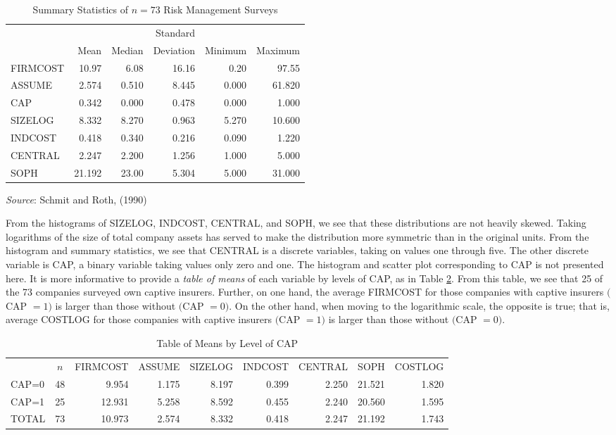 \begin{table}[h]
\caption{\label{T6:RiskSumStats} Summary Statistics of $n=73$ Risk
Management Surveys}
\begin{tabular}{lrrrrr}
\hline
&  &    & Standard &  &  \\
&  Mean & Median & Deviation & Minimum & Maximum \\ \hline FIRMCOST
&  10.97 & 6.08 & 16.16 &
0.20 & 97.55 \\
ASSUME &   2.574 & 0.510 & 8.445 &
0.000 & 61.820 \\
CAP & 0.342 & 0.000 & 0.478 &
0.000 & 1.000 \\
SIZELOG &   8.332 & 8.270 & 0.963 &
5.270 & 10.600 \\
INDCOST &   0.418 & 0.340 & 0.216 &
0.090 & 1.220 \\
CENTRAL &   2.247 & 2.200 & 1.256 &
1.000 & 5.000 \\
SOPH &  21.192 &23.00 & 5.304 & 5.000 & 31.000 \\ \hline
\end{tabular}

{\small \textit{Source}: Schmit and Roth, (1990)} 
\end{table}


From the histograms of SIZELOG, INDCOST, CENTRAL, and SOPH, we see
that these distributions are not heavily skewed. Taking logarithms
of the size of total company assets has served to make the
distribution more symmetric than in the original units. From the
histogram and summary statistics, we see that CENTRAL is a discrete
variables, taking on values one through five. The other discrete
variable is CAP, a binary variable taking values only zero and one.
The histogram and scatter plot corresponding to CAP is not presented
here. It is more informative to provide a \textit{table of means} of
each variable by levels of CAP, as in Table \ref{T6:RiskByCap}. From
this table, we see that 25 of the 73 companies surveyed own captive
insurers. Further, on one
hand, the average FIRMCOST for those companies with captive insurers $($CAP $%
=1)$ is larger than those without $($CAP $=0)$. On the other hand,
when moving to the logarithmic scale, the opposite is true; that is,
average COSTLOG for those companies with captive insurers $($CAP
$=1)$ is larger than those without $($CAP $=0)$.

\begin{table}[h]
\caption{\label{T6:RiskByCap} Table of Means by Level of CAP}
\begin{tabular}{lcrrrrrrr}
\hline
& $n$ &FIRMCOST&ASSUME&SIZELOG&INDCOST&CENTRAL&SOPH&COSTLOG\\
CAP=0 & 48 &  9.954 & 1.175 & 8.197 & 0.399 & 2.250 & 21.521 & 1.820 \\
CAP=1 & 25 & 12.931 & 5.258 & 8.592 & 0.455 & 2.240 & 20.560 & 1.595 \\
TOTAL & 73 & 10.973 & 2.574 & 8.332 & 0.418 & 2.247 & 21.192 & 1.743 \\
\hline
\end{tabular}
\end{table}

